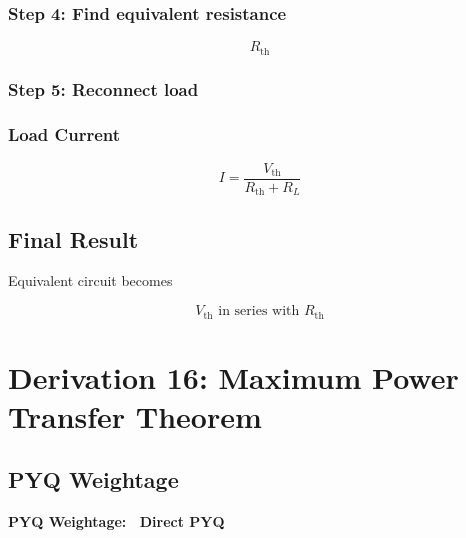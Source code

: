\documentclass[11pt,a4paper]{article}
\begin{document}
\subsubsection*{Step 4: Find equivalent resistance}
\begin{tcolorbox}[colback=RoyalBlue!5!white, colframe=RoyalBlue]
    \[ R_{\text{th}} \]
\end{tcolorbox}

\subsubsection*{Step 5: Reconnect load}

\subsubsection*{Load Current}
\begin{tcolorbox}[colback=RoyalBlue!5!white, colframe=RoyalBlue]
    \[ I = \frac{V_{\text{th}}}{R_{\text{th}}+R_L} \]
\end{tcolorbox}

\subsection*{Final Result}
Equivalent circuit becomes
\begin{tcolorbox}[colback=RoyalBlue!5!white, colframe=RoyalBlue]
    \[ V_{\text{th}} \text{ in series with } R_{\text{th}} \]
\end{tcolorbox}

\newpage

\section{Derivation 16: Maximum Power Transfer Theorem}

\subsection*{PYQ Weightage}
\begin{tcolorbox}[colback=yellow!10!white, colframe=orange, halign=center]
    \textbf{PYQ Weightage: \textasteriskcentered\textasteriskcentered\textasteriskcentered\textasteriskcentered\textasteriskcentered\ Direct PYQ}
\end{tcolorbox}
\end{document}
